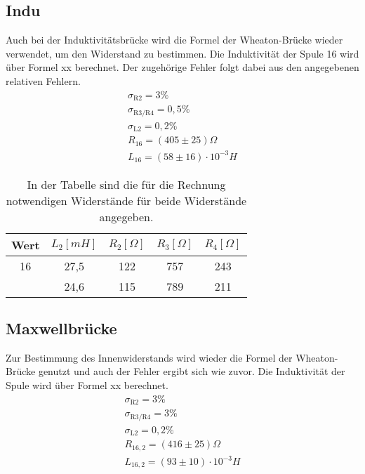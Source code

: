 \documentclass[titlepage = firstcover]{scrartcl}
\begin{document}
  \subsection{Indu}
  Auch bei der Induktivitätsbrücke wird die Formel der Wheaton-Brücke wieder verwendet, um den Widerstand zu bestimmen. Die Induktivität der Spule 16 wird
  über Formel xx berechnet. Der zugehörige Fehler folgt dabei aus den angegebenen relativen Fehlern.
  \begin{align*}
    \sigma_{\text{R2}} = 3 \% \\
    \sigma_{\text{R3/R4}} = 0,5 \% \\
    \sigma_{\text{L2}} = 0,2 \% \\
    R_{16} = (405 \pm 25) \Omega\\
    L_{16} = (58 \pm 16) \cdot 10^{-3} H
  \end{align*}

  \begin{table}[h]
    \centering
    \caption{In der Tabelle sind die für die Rechnung notwendigen Widerstände für beide Widerstände angegeben.}
    \label{tab:Indu}
    \begin{tabular}{c c c c c}
      \toprule
      {Wert} & {$L_{\text{2}} [mH]$} & {$R_{\text{2}} [\Omega]$} & {$R_{\text{3}} [\Omega]$} & {$R_{\text{4}} [\Omega]$} \\
      \midrule 
      16 & 27,5 & 122 & 757 & 243  \\
       & 24,6 & 115 & 789 & 211 \\
      \bottomrule
    \end{tabular}
  \end{table}

  \subsection{Maxwellbrücke}
  Zur Bestimmung des Innenwiderstands wird wieder die Formel der Wheaton-Brücke genutzt und auch der Fehler ergibt sich wie zuvor. Die Induktivität der Spule
  wird über Formel xx berechnet.
  \begin{align*}
    \sigma_{\text{R2}} = 3 \% \\
    \sigma_{\text{R3/R4}} = 3 \% \\
    \sigma_{\text{L2}} = 0,2 \% \\
    R_{16,2} = (416 \pm 25) \Omega\\
    L_{16,2} = (93 \pm 10) \cdot 10^{-3} H
  \end{align*}
\end{document}
